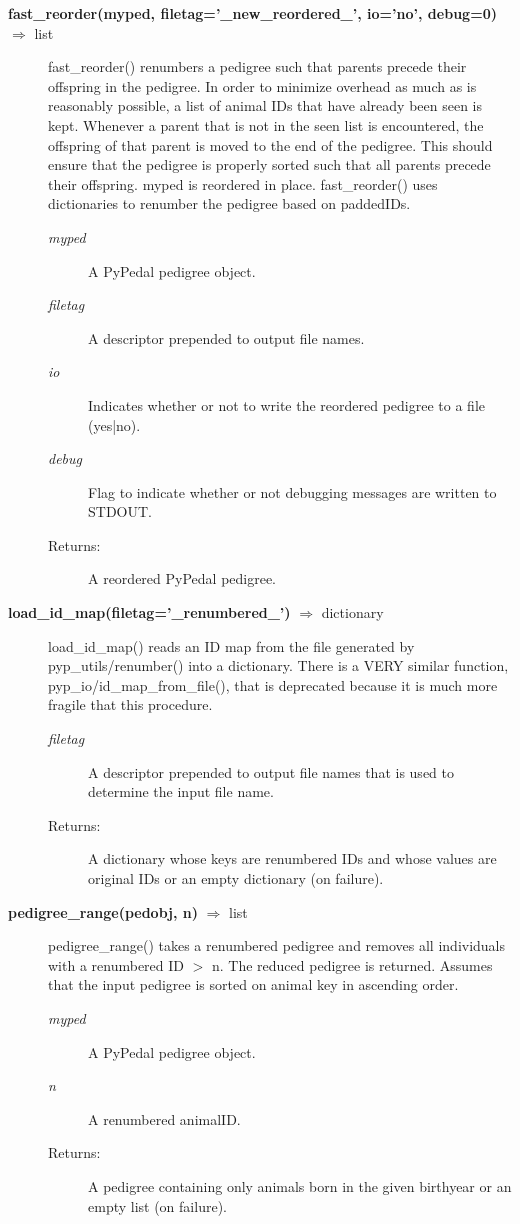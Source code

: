 \begin{description}
\item[\textbf{fast\_reorder(myped, filetag='\_new\_reordered\_', io='no', debug=0)} $\Rightarrow$ list]
fast\_reorder() renumbers a pedigree such that parents precede their offspring in the pedigree. In order to minimize overhead as much as is reasonably possible, a list of animal IDs that have already been seen is kept. Whenever a parent that is not in the seen list is encountered, the offspring of that parent is moved to the end of the pedigree. This should ensure that the pedigree is properly sorted such that all parents precede their offspring. myped is reordered in place. fast\_reorder() uses dictionaries to renumber the pedigree based on paddedIDs.
\begin{description}
\item[\emph{myped}] A PyPedal pedigree object.
\item[\emph{filetag}] A descriptor prepended to output file names.
\item[\emph{io}] Indicates whether or not to write the reordered pedigree to a file (yes|no).
\item[\emph{debug}] Flag to indicate whether or not debugging messages are written to STDOUT.
\item[Returns:] A reordered PyPedal pedigree.
\end{description}

\item[\textbf{load\_id\_map(filetag='\_renumbered\_')} $\Rightarrow$ dictionary]
load\_id\_map() reads an ID map from the file generated by pyp\_utils/renumber() into a dictionary. There is a VERY similar function, pyp\_io/id\_map\_from\_file(), that is deprecated because it is much more fragile that this procedure.
\begin{description}
\item[\emph{filetag}] A descriptor prepended to output file names that is used to determine the input file name.
\item[Returns:] A dictionary whose keys are renumbered IDs and whose values are original IDs or an empty dictionary (on failure).
\end{description}

\item[\textbf{pedigree\_range(pedobj, n)} $\Rightarrow$ list]
pedigree\_range() takes a renumbered pedigree and removes all individuals with a renumbered ID $>$ n. The reduced pedigree is returned. Assumes that the input pedigree is sorted on animal key in ascending order.
\begin{description}
\item[\emph{myped}] A PyPedal pedigree object.
\item[\emph{n}] A renumbered animalID.
\item[Returns:] A pedigree containing only animals born in the given birthyear or an empty list (on failure).
\end{description}


\end{description}
